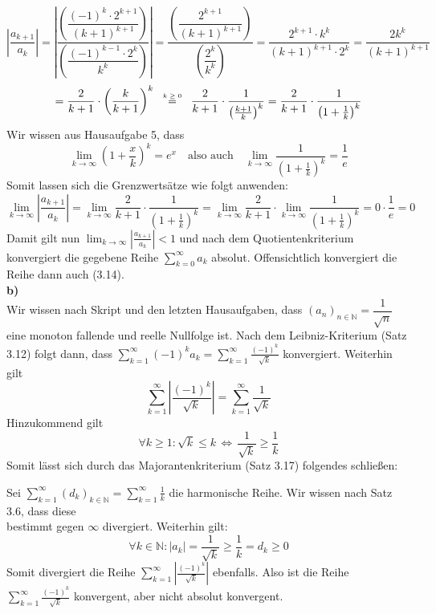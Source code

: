 \documentclass[a4paper,graphics,11pt]{article}
\newcommand{\up}[2]{\mathrel{\overset{\makebox[0pt]{\mbox{\normalfont\tiny #2}}}{#1}}}
\begin{document}
$$
    \left| \frac{a_{k+1}}{a_k}\right|
    = \left|\frac{\left(\dfrac{(-1)^k\cdot2^{k+1}}{(k+1)^{k+1}}\right)}{\left(\dfrac{(-1)^{k-1}\cdot 2^k}{k^k}\right)}\right|
    = \frac{\left(\dfrac{2^{k+1}}{(k+1)^{k+1}}\right)}{\left(\dfrac{2^k}{k^k}\right)}
    = \frac{2^{k+1}\cdot k^k}{(k+1)^{k+1} \cdot 2^k}
    = \frac{2k^k}{(k+1)^{k+1}}
$$$$
    =\frac{2}{k+1} \cdot \left(\frac{k}{k+1}\right)^k
    \quad\up{=}{$k\geq 0$}\quad \frac{2}{k+1} \cdot \frac{1}{\left(\frac{k+1}{k}\right)^k}
    = \frac{2}{k+1} \cdot \frac{1}{\left(1+\frac{1}{k}\right)^k}
$$
Wir wissen aus Hausaufgabe 5, dass
$$
    \lim_{k \to \infty} \left(1+\frac{x}{k}\right)^k = e^x\quad \text{also auch}\quad
    \lim_{k \to \infty} \frac{1}{\left(1+\frac{1}{k}\right)^k} = \frac{1}{e}
$$
Somit lassen sich die Grenzwertsätze wie folgt anwenden:
$$
    \lim_{k \to \infty} \left |\frac{a_{k+1}}{a_k}\right|
    = \lim_{k \to \infty} \frac{2}{k+1} \cdot \frac{1}{\left(1+\frac{1}{k}\right)^k}
    = \lim_{k \to \infty} \frac{2}{k+1} \cdot \lim_{k \to \infty} \frac{1}{\left(1+\frac{1}{k} \right)^k}
    = 0 \cdot \frac{1}{e} = 0
$$
Damit gilt nun $\lim_{k \to \infty}\limits \left|\frac{a_{k+1}}{a_k} \right| < 1$ und nach dem
Quotientenkriterium konvergiert die gegebene Reihe $\sum_{k=0}^{\infty} a_k$ absolut.
Offensichtlich konvergiert die Reihe dann auch (3.14).\\

\textbf{b)}\\[5pt]
Wir wissen nach Skript und den letzten Hausaufgaben, dass
$(a_n)_{n\in \mathbb{N}} = \dfrac{1}{\sqrt{n}}$ eine monoton fallende und
reelle Nullfolge ist. Nach dem Leibniz-Kriterium (Satz 3.12) folgt dann, dass
$\displaystyle\sum_{k=1}^{\infty} (-1)^ka_k = \sum_{k=1}^{\infty} \frac{(-1)^k}{\sqrt{k}}$ konvergiert.
Weiterhin gilt
$$
    \sum_{k=1}^{\infty} \left|\frac{(-1)^k}{\sqrt{k}}\right|
    = \sum_{k=1}^{\infty} \frac{1}{\sqrt{k}}
$$
Hinzukommend gilt
$$
    \forall k \geq 1\colon \sqrt{k}\leq k \,\Longleftrightarrow\, \frac{1}{\sqrt{k}}\geq \frac{1}{k}
$$
Somit lässt sich durch das Majorantenkriterium (Satz 3.17) folgendes schließen:

Sei $\sum_{k=1}^{\infty} (d_k)_{k\in \mathbb{N}}= \sum_{k=1}^{\infty} \frac{1}{k}$
die harmonische Reihe. Wir wissen nach Satz 3.6, dass diese\\
bestimmt gegen $\infty$ divergiert.
Weiterhin gilt:
$$
    \forall k \in \mathbb{N}\colon |a_k| = \frac{1}{\sqrt{k}} \geq \frac{1}{k} = d_k \geq 0
$$
Somit divergiert die Reihe $\sum_{k=1}^{\infty}\left|\frac{(-1)^k}{\sqrt{k}}\right|$
ebenfalls. Also ist die Reihe $\sum_{k=1}^{\infty} \frac{(-1)^k}{\sqrt{k}}$ konvergent, aber nicht
absolut konvergent.
\end{document}

